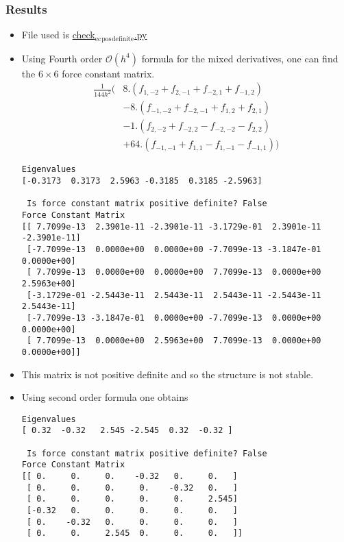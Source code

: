 \documentclass[11pt]{article}
\begin{document}
\subsubsection{Results}
\label{sec-1-11-1}
\begin{itemize}
\item File used is \href{file:///home/tigany/Documents/ti/complete_titanium/ti_01-11-18/check_ec_pos_definite/check_ec_pos_definite.py}{check$_{\text{ec}}$$_{\text{pos}}$$_{\text{definite}}$.py}
\item Using Fourth order $\mathcal{O}(h^{4})$ formula for the mixed
derivatives, one can find the $6\times6$ force constant matrix.
\begin{align}
  \frac{1}{144 h^2} (     &  8.  (  f_{ 1,-2} +  f_{ 2,-1} + f_{-2, 1} + f_{-1, 2} )\\
                         &-  8.  (  f_{-1,-2} +  f_{-2,-1} + f_{ 1, 2} + f_{ 2, 1} )\\
                         &-  1.  (  f_{ 2,-2} +  f_{-2, 2} - f_{-2,-2} - f_{ 2, 2} )\\
                         &+  64. (  f_{-1,-1} +  f_{ 1, 1} - f_{ 1,-1} - f_{-1, 1} )  )
\end{align}

\begin{verbatim}
Eigenvalues
[-0.3173  0.3173  2.5963 -0.3185  0.3185 -2.5963]

 Is force constant matrix positive definite? False
Force Constant Matrix
[[ 7.7099e-13  2.3901e-11 -2.3901e-11 -3.1729e-01  2.3901e-11 -2.3901e-11]
 [-7.7099e-13  0.0000e+00  0.0000e+00 -7.7099e-13 -3.1847e-01  0.0000e+00]
 [ 7.7099e-13  0.0000e+00  0.0000e+00  7.7099e-13  0.0000e+00  2.5963e+00]
 [-3.1729e-01 -2.5443e-11  2.5443e-11  2.5443e-11 -2.5443e-11  2.5443e-11]
 [-7.7099e-13 -3.1847e-01  0.0000e+00 -7.7099e-13  0.0000e+00  0.0000e+00]
 [ 7.7099e-13  0.0000e+00  2.5963e+00  7.7099e-13  0.0000e+00  0.0000e+00]]
\end{verbatim}

\item This matrix is not positive definite and so the structure is not
stable.

\item Using second order formula one obtains
\begin{verbatim}
Eigenvalues
[ 0.32  -0.32   2.545 -2.545  0.32  -0.32 ]

 Is force constant matrix positive definite? False
Force Constant Matrix
[[ 0.     0.     0.    -0.32   0.     0.   ]
 [ 0.     0.     0.     0.    -0.32   0.   ]
 [ 0.     0.     0.     0.     0.     2.545]
 [-0.32   0.     0.     0.     0.     0.   ]
 [ 0.    -0.32   0.     0.     0.     0.   ]
 [ 0.     0.     2.545  0.     0.     0.   ]]
\end{verbatim}


\end{itemize}
\end{document}
